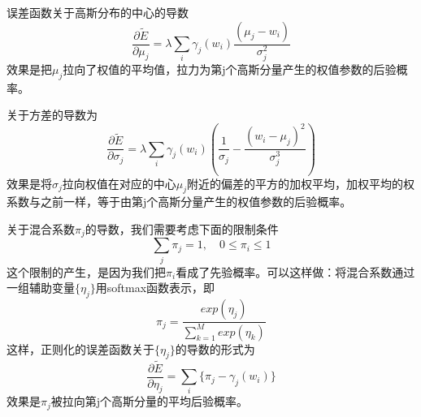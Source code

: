 误差函数关于高斯分布的中心的导数
\begin{equation}
	\frac{\partial \tilde{E}}{\partial \mu_j}=\lambda\sum_i\gamma_j(w_i)\frac{(\mu_j-w_i)}{\sigma_j^2}
\end{equation}
效果是把$\mu_j$拉向了权值的平均值，拉力为第j个高斯分量产生的权值参数的后验概率。

关于方差的导数为
\begin{equation}
	\frac{\partial \tilde{E}}{\partial \sigma_j}=\lambda\sum_i\gamma_j(w_i)\left(\frac{1}{\sigma_j}-\frac{(w_i-\mu_j)^2}{\sigma_j^3} \right)
\end{equation}
效果是将$\sigma_j$拉向权值在对应的中心$\mu_j$附近的偏差的平方的加权平均，加权平均的权系数与之前一样，等于由第j个高斯分量产生的权值参数的后验概率。

关于混合系数$\pi_j$的导数，我们需要考虑下面的限制条件 
\begin{equation}
	\sum_{j}\pi_j=1,\quad 0\leqslant \pi_i \leqslant 1
\end{equation}
这个限制的产生，是因为我们把$\pi_i$看成了先验概率。可以这样做：将混合系数通过一组辅助变量$\{\eta_j \}$用softmax函数表示，即
\begin{equation}
	\pi_j=\frac{exp(\eta_j)}{\sum_{k=1}^{M}exp(\eta_k)}
\end{equation}
这样，正则化的误差函数关于$\{\eta_j \}$的导数的形式为
\begin{equation}
	\frac{\partial \tilde{E}}{\partial \eta_j}=\sum_i\{\pi_j-\gamma_j(w_i) \}
\end{equation}
效果是$\pi_j$被拉向第j个高斯分量的平均后验概率。